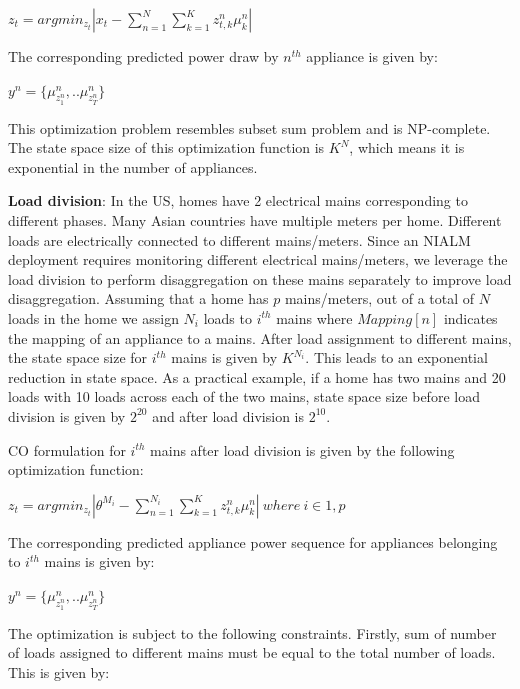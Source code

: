 \documentclass[conference]{IEEEtran}
\begin{document}
$z_t=arg min_{z_t}|x_t-\sum\limits_{n=1}^{N}\sum\limits_{k=1}^{K}z_{t,k}^n\mu_k^n|$

\noindent The corresponding predicted power draw by $n^{th}$ appliance is given by:

$y^n=\{\mu_{z_1^n}^n,..\mu_{z_T^n}^n \}$

\noindent This optimization problem resembles subset sum problem \cite{knapsack} and is NP-complete. The state space size of this optimization function is $K^N$, which means it is exponential in the number of appliances. 


\noindent \textbf{Load division}: In the US, homes have 2 electrical mains corresponding to different phases. Many Asian countries have multiple meters per home. Different loads are electrically connected to different mains/meters. Since an NIALM deployment requires monitoring different electrical mains/meters, we leverage the load division to perform disaggregation on these mains separately to improve load disaggregation. Assuming that a home has $p$ mains/meters, out of a total of $N$ loads in the home we assign $N_i$ loads to $i^{th}$ mains where $Mapping[n]$ indicates the mapping of an appliance to a mains.
After load assignment to different mains, the state space size for $i^{th}$ mains is given by $K^{N_i}$. This leads to an exponential reduction in state space. As a practical example, if a home has two mains and 20 loads with 10 loads across each of the two mains, state space size before load division is given by $2^{20}$ and after load division is $2^{10}$.

\noindent CO formulation for $i^{th}$ mains after load division is given by the following optimization function: 

$z_t=arg min_{z_t}|\theta^{M_i}-\sum\limits_{n=1}^{N_i}\sum\limits_{k=1}^{K}z_{t,k}^n\mu_k^n| \:where\: i\in {1,p}$

\noindent The corresponding predicted appliance power sequence for appliances belonging to $i^{th}$ mains is given by:

$y^n=\{\mu_{z_1^n}^n,..\mu_{z_T^n}^n \}$

\noindent The optimization is subject to the following constraints. Firstly, sum of number of loads assigned to different mains must be equal to the total number of loads. This is given by:
\end{document}
